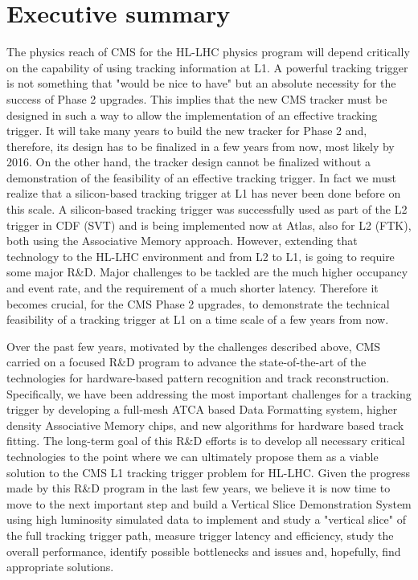 \section{Executive summary}

\noindent The physics reach of CMS for the HL-LHC physics program will depend critically on the capability of using tracking information at L1. A powerful tracking trigger is not something that "would be nice to have" but an absolute necessity for the success of Phase 2 upgrades. This implies that the new CMS tracker must be designed in such a way to allow the implementation of an effective tracking trigger. It will take many years to build the new tracker for Phase 2 and, therefore, its design has to be finalized in a few years from now, most likely by 2016. On the other hand, the tracker design cannot be finalized without a demonstration of the feasibility of an effective tracking trigger. In fact we must realize that a silicon-based tracking trigger at L1 has never been done before on this scale. A silicon-based tracking trigger was successfully used as part of the L2 trigger in CDF (SVT) and is being implemented now at Atlas, also for L2 (FTK), both using the Associative Memory approach. However, extending that technology to the HL-LHC environment and from L2 to L1, is going to require some major R\&D. Major challenges to be tackled are the much higher occupancy and event rate, and the requirement of a much shorter latency. Therefore it becomes crucial, for the CMS Phase 2 upgrades, to demonstrate the technical feasibility of a tracking trigger at L1 on a time scale of a few years from now. 

\noindent Over the past few years, motivated by the challenges described above, CMS carried on a focused R\&D program to advance the state-of-the-art of the technologies for hardware-based pattern recognition and track reconstruction. Specifically, we have been addressing the most important challenges for a tracking trigger by developing a full-mesh ATCA based Data Formatting system, higher density Associative Memory chips, and new algorithms for hardware based track fitting. The long-term goal of this R\&D efforts is to develop all necessary critical technologies to the point where we can ultimately propose them as a viable solution to the CMS L1 tracking trigger problem for HL-LHC. Given the progress made by this R\&D program in the last few years, we believe it is now time to move to the next important step and build a Vertical Slice Demonstration System using high luminosity simulated data to implement and study a "vertical slice" of the full tracking trigger path, measure trigger latency and efficiency, study the overall performance, identify possible bottlenecks and issues and, hopefully, find appropriate solutions. 

